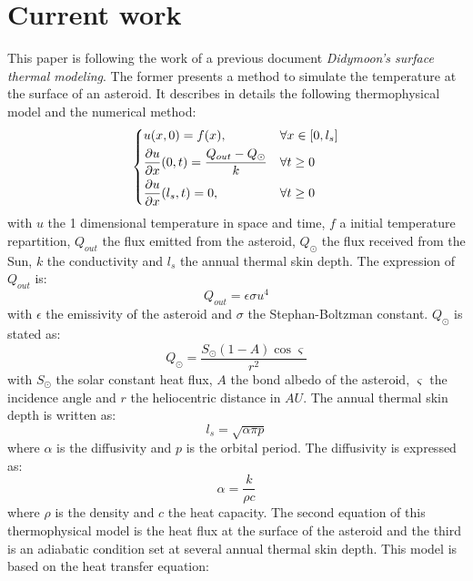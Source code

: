 \section{Current work}
\label{sec:2}

This paper is following the work of a previous document \textit{Didymoon's surface thermal modeling}. The former presents a method to simulate the temperature at the surface of an asteroid. It describes in details the following thermophysical model and the numerical method:
\begin{equation}
    \begin{dcases}
        u(x,0)=f(x),                                                  & \forall x\in[0,l_s] \\
        \frac{\partial{u}}{\partial{x}}(0,t)=\frac{Q_{out}-Q_{\odot}}{k} & \forall t\geq0      \\
        \frac{\partial{u}}{\partial{x}}(l_s,t)=0,                     & \forall t\geq0
    \end{dcases}
    \label{eq:2.1}
\end{equation}
with $u$ the 1 dimensional temperature in space and time, $f$ a initial temperature repartition, $Q_{out}$ the flux emitted from the asteroid, $Q_{\odot}$ the flux received from the Sun, $k$ the conductivity and $l_s$ the annual thermal skin depth. The expression of $Q_{out}$ is:
\begin{equation}
    Q_{out}=\epsilon\sigma u^4
    \label{eq:2.2}
\end{equation}
with $\epsilon$ the emissivity of the asteroid and $\sigma$ the Stephan-Boltzman constant. $Q_{\odot}$ is stated as:
\begin{equation}
    Q_{\odot}=\frac{S_{\odot}\left(1-A\right)\cos{\varsigma}}{r^2}
    \label{eq:2.3}
\end{equation}
with $S_{\odot}$ the solar constant heat flux, $A$ the bond albedo of the asteroid, $\varsigma$ the incidence angle and $r$ the heliocentric distance in $AU$. The annual thermal skin depth is written as:
\begin{equation}
    l_s=\sqrt{\alpha\pi p}
    \label{eq:2.4}
\end{equation}
where $\alpha$ is the diffusivity and $p$ is the orbital period. The diffusivity is expressed as:
\begin{equation}
    \alpha=\frac{k}{\rho c}
    \label{eq:2.5}
\end{equation}
where $\rho$ is the density and $c$ the heat capacity. The second equation of this thermophysical model is the heat flux at the surface of the asteroid and the third is an adiabatic condition set at several annual thermal skin depth. This model is based on the heat transfer equation:
